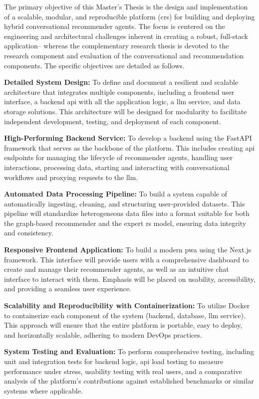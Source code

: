 The primary objective of this Master's Thesis is the design and implementation of a scalable, modular, and reproducible platform (\acl{crs}) for building and deploying hybrid conversational recommender agents. The focus is centered on the engineering and architectural challenges inherent in creating a robust, full-stack application-- whereas the complementary research thesis \cite{MUI2ICSI_THESIS} is devoted to the research component and evaluation of the conversational and recommendation components. The specific objectives are detailed as follows.

\begin{objetive}
    \item \textbf{Detailed System Design:} To define and document a resilient and scalable architecture that integrates multiple components, including a frontend user interface, a backend \acs{api} with all the application logic, a \ac{llm} service, and data storage solutions. This architecture will be designed for modularity to facilitate independent development, testing, and deployment of each component.

    \item \textbf{High-Performing Backend Service:} To develop a backend using the FastAPI framework that serves as the backbone of the platform. This includes creating \acs{api} endpoints for managing the lifecycle of recommender agents, handling user interactions, processing data, starting and interacting with conversational workflows and proxying requests to the \ac{llm}.

    \item \textbf{Automated Data Processing Pipeline:} To build a system capable of automatically ingesting, cleaning, and structuring user-provided datasets. This pipeline will standardize heterogeneous data files into a format suitable for both the graph-based recommender and the expert \acs{rs} model, ensuring data integrity and consistency.

    \item \textbf{Responsive Frontend Application:} To build a modern \ac{pwa} using the Next.js framework. This interface will provide users with a comprehensive dashboard to create and manage their recommender agents, as well as an intuitive chat interface to interact with them. Emphasis will be placed on usability, accessibility, and providing a seamless user experience.

    \item \textbf{Scalability and Reproducibility with Containerization:} To utilize Docker to containerize each component of the system (backend, database, \ac{llm} service). This approach will ensure that the entire platform is portable, easy to deploy, and horizontally scalable, adhering to modern DevOps practices.

    \item \textbf{System Testing and Evaluation:} To perform comprehensive testing, including unit and integration tests for backend logic, \acs{api} load testing to measure performance under stress, usability testing with real users, and a comparative analysis of the platform's contributions against established benchmarks or similar systems where applicable.
\end{objetive}

